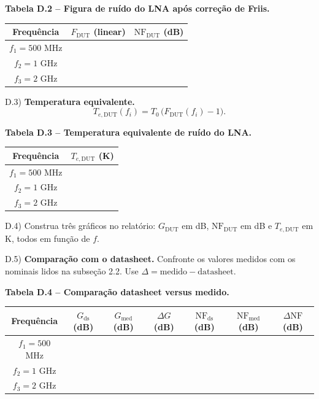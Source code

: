 \documentclass[11pt,a4paper]{article}
\begin{document}
\textbf{Tabela D.2 -- Figura de ruído do LNA após correção de Friis.}

{\renewcommand{\arraystretch}{1.5}
\begin{center}
\begin{tabular}{|c|c|c|}
\hline
\textbf{Frequência} & \textbf{$F_{\text{DUT}}$ (linear)} & \textbf{$\mathrm{NF}_{\text{DUT}}$ (dB)} \\
\hline
$f_1 = 500$ MHz & & \\
\hline
$f_2 = 1$ GHz & & \\
\hline
$f_3 = 2$ GHz & & \\
\hline
\end{tabular}
\end{center}
}

D.3) \textbf{Temperatura equivalente.}
\[
T_{e,\text{DUT}}(f_i) = T_0\,\bigl(F_{\text{DUT}}(f_i) - 1\bigr).
\]

\textbf{Tabela D.3 -- Temperatura equivalente de ruído do LNA.}

{\renewcommand{\arraystretch}{1.5}
\begin{center}
\begin{tabular}{|c|c|}
\hline
\textbf{Frequência} & \textbf{$T_{e,\text{DUT}}$ (K)} \\
\hline
$f_1 = 500$ MHz & \\
\hline
$f_2 = 1$ GHz & \\
\hline
$f_3 = 2$ GHz & \\
\hline
\end{tabular}
\end{center}
}

D.4) Construa três gráficos no relatório: $G_{\text{DUT}}$ em dB, $\mathrm{NF}_{\text{DUT}}$ em dB e $T_{e,\text{DUT}}$ em K, todos em função de $f$.

D.5) \textbf{Comparação com o datasheet.} Confronte os valores medidos com os nominais lidos na subseção 2.2. Use $\Delta = \text{medido} - \text{datasheet}$.

\textbf{Tabela D.4 -- Comparação datasheet versus medido.}

{\renewcommand{\arraystretch}{1.5}
\begin{center}
\footnotesize
\begin{tabular}{|c|c|c|c|c|c|c|}
\hline
\textbf{Frequência} & \textbf{$G_{\text{ds}}$ (dB)} & \textbf{$G_{\text{med}}$ (dB)} & \textbf{$\Delta G$ (dB)} & \textbf{$\mathrm{NF}_{\text{ds}}$ (dB)} & \textbf{$\mathrm{NF}_{\text{med}}$ (dB)} & \textbf{$\Delta\mathrm{NF}$ (dB)} \\
\hline
$f_1 = 500$ MHz & & & & & & \\
\hline
$f_2 = 1$ GHz & & & & & & \\
\hline
$f_3 = 2$ GHz & & & & & & \\
\hline
\end{tabular}
\end{center}
}
\end{document}
